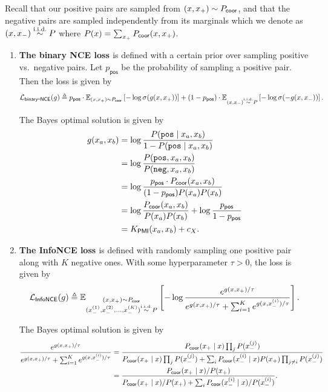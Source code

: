 Recall that our positive pairs are sampled from $(x, x_+) \sim {P}_\mathsf{coor}$, and that the negative pairs are sampled independently from its marginals which we denote as $(x, x_-) \overset{\text{i.i.d.}}{\sim} P$ where  $P(x) = \sum_{x_+} {P}_\mathsf{coor}(x, x_+)$.
\begin{enumerate}
    \item \textbf{The binary NCE loss \citep{gutmann2010noise}} is defined with a certain prior over sampling positive vs.~negative pairs. Let $p_\mathsf{pos}$ be the probability of sampling a positive pair. Then the loss is given by \begin{equation}
        \mathcal{L}_\mathsf{binary\mbox{-}NCE}(g) 
        \triangleq p_\mathsf{pos} \cdot \mathbb{E}_{(x, x_+) \sim {P}_\mathsf{coor}}\left[ -\log \sigma(g(x, x_+)) \right]
        + (1 - p_\mathsf{pos}) \cdot \mathbb{E}_{(x, x_-) \overset{\text{i.i.d.}}{\sim} P}\left[ -\log \sigma(-g(x, x_-)) \right].
    \end{equation}

    The Bayes optimal solution is given by \begin{align}
        g(x_a, x_b) 
        & = \log \frac{P(\texttt{pos} \mathrel{\vert} x_a, x_b)}{1 - P(\texttt{pos} \mathrel{\vert} x_a, x_b)} \\
        & = \log \frac{P(\texttt{pos}, x_a, x_b)}{P(\texttt{neg}, x_a, x_b)} \\
        & = \log \frac{p_\mathsf{pos} \cdot {P}_\mathsf{coor}(x_a, x_b)}{(1 - p_\mathsf{pos}) P(x_a) P(x_b)} \\
        & = \log \frac{{P}_\mathsf{coor}(x_a, x_b)}{P(x_a)P(x_b)} + \log \frac{p_\mathsf{pos}}{1 - p_\mathsf{pos}} \\
        & = K_\mathsf{PMI}(x_a, x_b) + c_X.
    \end{align}
    \item \textbf{The InfoNCE loss \citep{oord2018representation}} is defined with randomly sampling one positive pair along with $K$ negative ones. With some hyperparameter $\tau > 0$, the loss is given by \begin{equation}
        \mathcal{L}_\mathsf{InfoNCE}(g) 
        \triangleq \mathbb{E}_{\substack{(x, x_+) \sim {P}_\mathsf{coor} \\ (x_-^{(1)}, x_-^{(2)}, \dots, x_-^{(K)}) \overset{\text{i.i.d.}}{\sim} P}}\left[ -\log \frac{e^{g(x, x_+) / \tau}}{e^{g(x, x_+) / \tau} + \sum_{i=1}^K e^{g(x, x_-^{(i)}) / \tau}} \right].
    \end{equation}

    The Bayes optimal solution is given by \begin{align}
        \frac{e^{g(x, x_+) / \tau}}{e^{g(x, x_+) / \tau} + \sum_{i=1}^K e^{g(x, x_-^{(i)}) / \tau}}
        & = \frac{{P}_\mathsf{coor}(x_+ \mathrel{\vert} x) \prod_j P(x_-^{(j)}) }{{P}_\mathsf{coor}(x_+ \mathrel{\vert} x) \prod_j P(x_-^{(j)})  + \sum_i {P}_\mathsf{coor}(x_-^{(i)} \mathrel{\vert} x) P(x_+) \prod_{j \neq i} P(x_-^{(j)})} \\
        & = \frac{{P}_\mathsf{coor}(x_+ \mathrel{\vert} x) / P(x_+) }{{P}_\mathsf{coor}(x_+ \mathrel{\vert} x) / P(x_+) + \sum_i {P}_\mathsf{coor}(x_-^{(i)} \mathrel{\vert} x) / P(x_-^{(i)})}.
    \end{align}


\end{enumerate}
